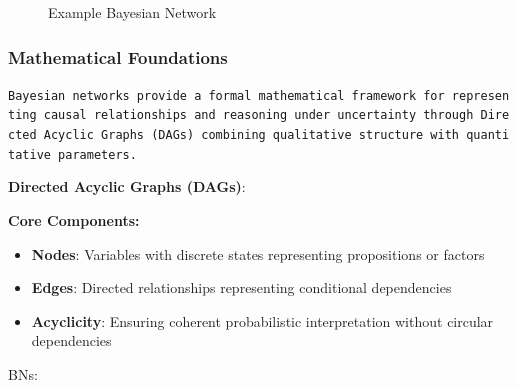 \documentclass[
  11pt,
  letterpaper,
]{book}
\providecommand{\tightlist}{%
  \setlength{\itemsep}{0pt}\setlength{\parskip}{0pt}}
\begin{document}
\begin{figure}


\caption{\label{fig-bayesian-network}Example Bayesian Network}

\end{figure}%

\subsubsection{Mathematical
Foundations}\label{sec-mathematical-foundations}

\texttt{Bayesian\ networks\ provide\ a\ formal\ mathematical\ framework\ for\ representing\ causal\ relationships\ and\ reasoning\ under\ uncertainty\ through\ Directed\ Acyclic\ Graphs\ (DAGs)\ combining\ qualitative\ structure\ with\ quantitative\ parameters.}

\textbf{Directed Acyclic Graphs (DAGs)}:

\textbf{Core Components:}

\begin{itemize}
\tightlist
\item
  \textbf{Nodes}: Variables with discrete states representing
  propositions or factors
\item
  \textbf{Edges}: Directed relationships representing conditional
  dependencies
\item
  \textbf{Acyclicity}: Ensuring coherent probabilistic interpretation
  without circular dependencies
\end{itemize}

BNs:
\end{document}
